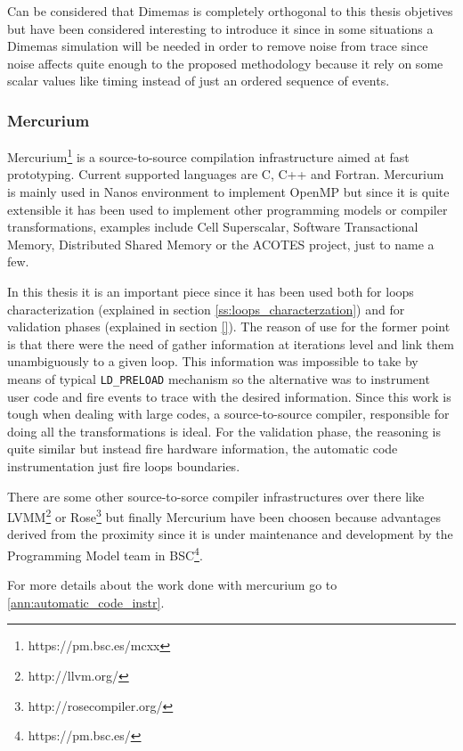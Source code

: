 Can be considered that Dimemas is completely orthogonal to this thesis objetives
but have been considered interesting to introduce it since in some situations a
Dimemas simulation will be needed in order to remove noise from trace since
noise affects quite enough to the proposed methodology because it rely on some
scalar values like timing instead of just an ordered sequence of events.

\subsubsection{Mercurium}\label{ss:mercurium}

Mercurium\footnote{https://pm.bsc.es/mcxx} is a source-to-source compilation 
infrastructure aimed at fast prototyping. Current supported languages are C, C++
and Fortran. Mercurium is mainly used in Nanos environment to implement OpenMP but
since it is quite extensible it has been used to implement other programming models
or compiler transformations, examples include Cell Superscalar, Software Transactional
Memory, Distributed Shared Memory or the ACOTES project, just to name a few. 

In this thesis it is an important piece since it has been used both for loops
characterization (explained in section \ref{ss:loops_characterzation}) and for
validation phases (explained in section \ref{}). The reason of use for the former point
is that there were the need of gather information at iterations level and link them
unambiguously to a given loop. This information was impossible to take by means of
typical {\tt LD\_PRELOAD} mechanism so the alternative was to instrument user code and
fire events to trace with the desired information. Since this work is tough when
dealing with large codes, a source-to-source compiler, responsible for doing all the
transformations is ideal. For the validation phase, the reasoning is quite similar but
instead fire hardware information, the automatic code instrumentation just fire loops
boundaries.

There are some other source-to-sorce compiler infrastructures over there like
LVMM\footnote{http://llvm.org/} or Rose\footnote{http://rosecompiler.org/} but finally
Mercurium have been choosen because advantages derived from the proximity since it is
under maintenance and development by the Programming Model team in 
BSC\footnote{https://pm.bsc.es/}.

For more details about the work done with mercurium go to \ref{ann:automatic_code_instr}.

